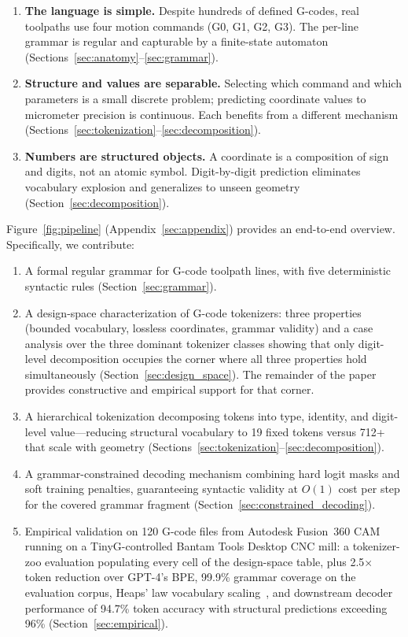 \documentclass[11pt]{article}
\begin{document}
\begin{enumerate}[leftmargin=*]
    \item \textbf{The language is simple.} Despite hundreds of defined G-codes, real toolpaths use four motion commands (G0, G1, G2, G3). The per-line grammar is regular and capturable by a finite-state automaton (Sections~\ref{sec:anatomy}--\ref{sec:grammar}).

    \item \textbf{Structure and values are separable.} Selecting which command and which parameters is a small discrete problem; predicting coordinate values to micrometer precision is continuous. Each benefits from a different mechanism (Sections~\ref{sec:tokenization}--\ref{sec:decomposition}).

    \item \textbf{Numbers are structured objects.} A coordinate is a composition of sign and digits, not an atomic symbol. Digit-by-digit prediction eliminates vocabulary explosion and generalizes to unseen geometry (Section~\ref{sec:decomposition}).
\end{enumerate}

Figure~\ref{fig:pipeline} (Appendix~\ref{sec:appendix}) provides an end-to-end overview. Specifically, we contribute:
\begin{enumerate}[leftmargin=*, nosep]
    \item A formal regular grammar for G-code toolpath lines, with five deterministic syntactic rules (Section~\ref{sec:grammar}).
    \item A design-space characterization of G-code tokenizers: three properties (bounded vocabulary, lossless coordinates, grammar validity) and a case analysis over the three dominant tokenizer classes showing that only digit-level decomposition occupies the corner where all three properties hold simultaneously (Section~\ref{sec:design_space}). The remainder of the paper provides constructive and empirical support for that corner.
    \item A hierarchical tokenization decomposing tokens into type, identity, and digit-level value---reducing structural vocabulary to 19 fixed tokens versus 712+ that scale with geometry (Sections~\ref{sec:tokenization}--\ref{sec:decomposition}).
    \item A grammar-constrained decoding mechanism combining hard logit masks and soft training penalties, guaranteeing syntactic validity at $O(1)$ cost per step for the covered grammar fragment (Section~\ref{sec:constrained_decoding}).
    \item Empirical validation on 120 G-code files from Autodesk Fusion~360 CAM running on a TinyG-controlled Bantam Tools Desktop CNC mill: a tokenizer-zoo evaluation populating every cell of the design-space table, plus 2.5$\times$ token reduction over GPT-4's BPE, 99.9\% grammar coverage on the evaluation corpus, Heaps' law vocabulary scaling~\cite{heaps1978}, and downstream decoder performance of 94.7\% token accuracy with structural predictions exceeding 96\% (Section~\ref{sec:empirical}).
\end{enumerate}
\end{document}
